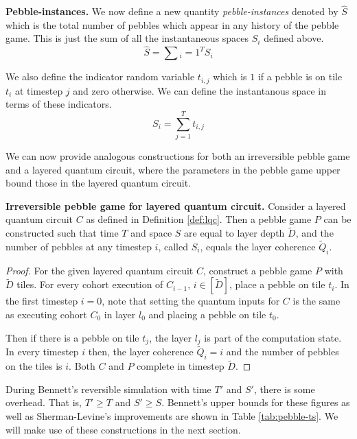 \begin{definition}{\textbf{Pebble-instances.}}
We now define a new quantity \emph{pebble-instances} denoted by
$\hat{S}$ which is the total number of pebbles which appear in
any history of the pebble game. This is just the sum of all the
instantaneous spaces $S_i$ defined above.
\begin{equation}
\hat{S} = \sum{_i=1}^T S_i
\end{equation}

We also define the indicator random variable $t_{i,j}$ which is $1$
if a pebble is on tile $t_i$ at timestep $j$ and zero otherwise.
We can define the instantanous space in terms of these indicators.
\begin{equation}
S_i = \sum_{j=1}^T t_{i,j}
\end{equation}
\end{definition}

We can now provide analogous constructions for both an irreversible pebble game
and a layered quantum circuit, where the parameters in the pebble game
upper bound those in the layered quantum circuit.

\begin{proposition}{\textbf{Irreversible pebble game for layered quantum circuit.}}
Consider a layered quantum circuit $C$
as defined in 
Definition \ref{def:lqc}. Then a pebble game $P$ can be constructed such that
time $T$ and space $S$ are equal to layer depth $\tilde{D}$,
and the number of pebbles at any timestep $i$, called $S_i$, equals the
layer coherence $\tilde{Q}_i$.
\label{thm:ipg-lqc}
\end{proposition}

\begin{proof}
For the given layered quantum circuit $C$, construct a pebble game $P$
with $\tilde{D}$ tiles. For every cohort execution of $C_{i-1}$, $i \in [\tilde{D}]$,
place a pebble on tile $t_i$.
In the first timestep $i=0$, note that setting the quantum inputs for $C$
is the same as executing cohort $C_0$ in layer $l_0$ and 
placing a pebble on tile $t_0$.

Then if there is a pebble on tile $t_j$,
the layer $l_j$ is part of the computation state. In every timestep $i$ then, the layer coherence
$\tilde{Q}_i = i$ and the number of pebbles on the tiles is $i$.
Both $C$ and $P$ complete in timestep $\tilde{D}$.
\end{proof}

During Bennett's reversible
simulation with time $T'$ and $S'$, there is some overhead. That is,
$T' \ge T$ and $S' \ge S$. Bennett's upper bounds for these figures
as well as Sherman-Levine's improvements \cite{Levine1990} are shown
in Table \ref{tab:pebble-ts}. We will make use of these constructions in
the next section.

